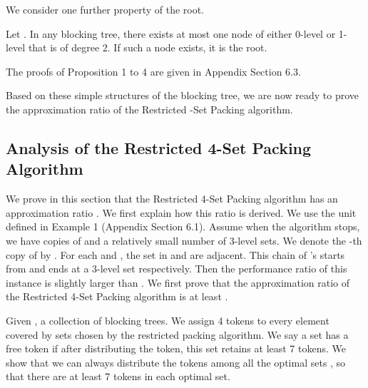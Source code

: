 \documentclass[runningheads,a4paper]{llncs}
\numberwithin{equation}{section}
\begin{document}
We consider one further property of the root.

\begin{proposition}
Let .
In any blocking tree, there exists at most one node of either 0-level or 1-level that is of degree 2. If such a node exists, it is the root.
\end{proposition}

The proofs of Proposition 1 to 4 are given in Appendix Section 6.3.

Based on these simple structures of the blocking tree, we are now ready to prove the approximation ratio of the Restricted -Set Packing algorithm.

\subsection{Analysis of the Restricted 4-Set Packing Algorithm}

We prove in this section that the Restricted 4-Set Packing algorithm has an approximation ratio . We first explain how this  ratio is derived. We use the unit  defined in Example 1 (Appendix Section 6.1). Assume when the algorithm stops, we have  copies of  and a relatively small number of 3-level sets. We denote the -th copy of  by . For each  and , the set  in  and  are adjacent. This chain of 's starts from and ends at a 3-level set respectively. Then the performance ratio of this instance is slightly larger than . We first prove that the approximation ratio of the Restricted 4-Set Packing algorithm is at least .

Given , a collection of blocking trees. We assign 4 tokens to every element covered by sets chosen by the restricted packing algorithm. We say a set has a free token if after distributing the token, this set retains at least 7 tokens. We show that we can always distribute the tokens among all the optimal sets , so that there are at least 7 tokens in each optimal set.
\end{document}
